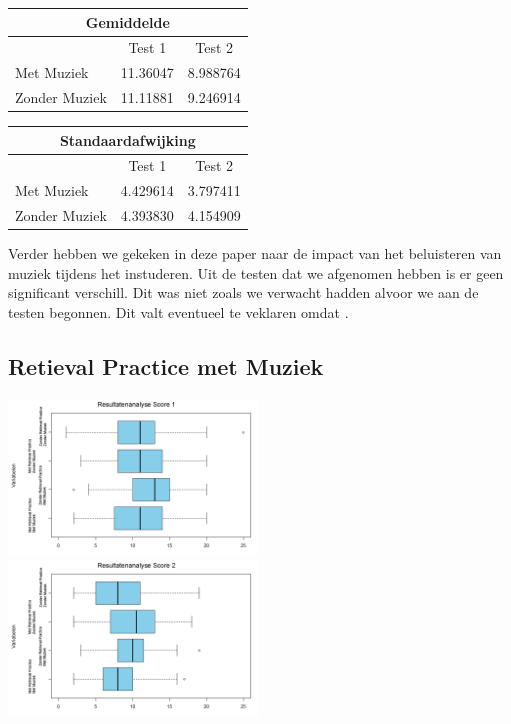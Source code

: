 \documentclass{hogent-article}
\begin{document}
	\begin{tabular}{ |p{10em}|c|c| }
	\hline
		\multicolumn{3}{|c|}{Gemiddelde} \\
	\hline
		& Test 1 & Test 2 \\
	\hline
		Met Muziek & 11.36047 & 8.988764 \\
		Zonder Muziek & 11.11881 & 9.246914 \\
	\hline
	\end{tabular}

	\begin{tabular}{ |p{10em}|c|c| }
	\hline
		\multicolumn{3}{|c|}{Standaardafwijking} \\
	\hline
		& Test 1 & Test 2 \\
	\hline
		Met Muziek & 4.429614 & 3.797411 \\
		Zonder Muziek & 4.393830 & 4.154909 \\
	\hline
	\end{tabular}

	Verder hebben we gekeken in deze paper naar de impact van het beluisteren van muziek tijdens het instuderen. Uit de testen dat we afgenomen hebben is er geen significant verschill. Dit was niet zoals we verwacht hadden alvoor we aan de testen begonnen. Dit valt eventueel te veklaren omdat . 
	
	\subsection{Retieval Practice met Muziek}
	\includegraphics[width=250px]{Final_boxplots_Score1}
	\includegraphics[width=250px]{Final_boxplots_Score2}
	
\end{document}
